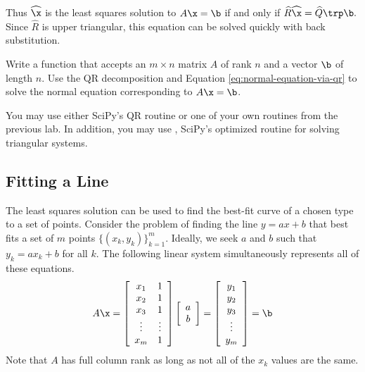 Thus $\widehat{\x}$ is the least squares solution to $A\x=\b$ if and only if $\widehat{R}\widehat{\x} = \widehat{Q}\trp\b.$
Since $\widehat{R}$ is upper triangular, this equation can be solved quickly with back substitution.

\begin{problem} %
Write a function that accepts an $m \times n$ matrix $A$ of rank $n$ and a vector $\b$ of length $n$.
Use the QR decomposition and Equation \ref{eq:normal-equation-via-qr} to solve the normal equation corresponding to $A\x = \b$.

You may use either SciPy's QR routine or one of your own routines from the previous lab.
In addition, you may use , SciPy's optimized routine for solving triangular systems.

\label{prob:lstsq-via-qr}
\end{problem}

\subsection*{Fitting a Line} %

The least squares solution can be used to find the best-fit curve of a chosen type to a set of points.
Consider the problem of finding the line $y = ax + b$ that best fits a set of $m$ points $\{(x_k, y_k)\}_{k=1}^m$.
Ideally, we seek $a$ and $b$ such that $y_k = ax_k + b$ for all $k$.
The following linear system simultaneously represents all of these equations.
%
\begin{equation}
A\x =
\left[\begin{array}{cc}
x_1 & 1 \\
x_2 & 1 \\
x_3 & 1 \\
\vdots & \vdots \\
x_m & 1
\end{array}\right]
\left[\begin{array}{c} a \\ b \end{array}\right]
=
\left[\begin{array}{c} y_1 \\ y_2 \\ y_3 \\ \vdots \\ y_m \end{array}\right]
= \b
\label{eq:linear-least-squares}
\end{equation}
%
Note that $A$ has full column rank as long as not all of the $x_k$ values are the same.

